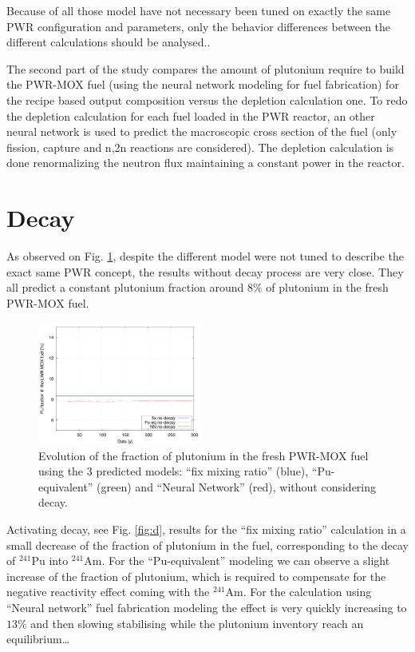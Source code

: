 \documentclass{anstrans}
\begin{document}
Because of all those model have not necessary been tuned on exactly the same
PWR configuration and parameters, only the behavior differences between the
different calculations should be analysed..


The second part of the study compares the amount of plutonium require to build
the PWR-MOX fuel (using the neural network modeling for fuel fabrication) for
the recipe based output composition versus the depletion calculation one.  To
redo the depletion calculation for each fuel loaded in the PWR reactor, an other
neural network is used to predict the macroscopic cross section of the fuel
\cite{Leniau2015125} (only fission, capture and n,2n reactions are considered).
The depletion calculation is done renormalizing the neutron flux maintaining a
constant power in the reactor.


\section{Decay}


As observed on Fig. \ref{fig:nod}, despite the different model were not tuned to
describe the exact same PWR concept, the results without decay process are very
close. They all predict a constant plutonium fraction around $8\%$ of plutonium
in the fresh PWR-MOX fuel.

\begin{figure}[ht] %
  \centering
  \includegraphics[width=0.48\textwidth]{nodecay_pu_contribution.png}
  \caption{Evolution of the fraction of plutonium in the fresh PWR-MOX fuel
  using the 3 predicted models: ``fix mixing ratio'' (blue), ``Pu-equivalent''
  (green) and ``Neural Network'' (red), without considering decay.}
  \label{fig:nod}
\end{figure}


Activating decay, see Fig. \ref{fig:d}, results for the ``fix mixing ratio''
calculation in a small decrease of the fraction of plutonium in the fuel,
corresponding to the decay of $^{241}$Pu into $^{241}$Am. For the
``Pu-equivalent'' modeling we can observe a slight increase of the fraction of
plutonium, which is required to compensate for the negative reactivity effect
coming with the $^{241}$Am. For the calculation using ``Neural network'' fuel
fabrication modeling the effect is very quickly increasing to $13\%$ and then
slowing stabilising while the plutonium inventory reach an equilibrium\ldots
\end{document}
